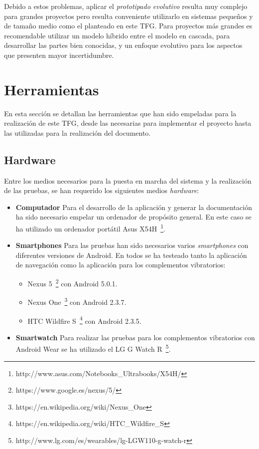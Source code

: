 Debido a estos problemas, aplicar el \emph{prototipado evolutivo} resulta muy complejo para grandes
proyectos pero resulta conveniente utilizarlo en sistemas pequeños y de tamaño medio como el
planteado en este \acs{TFG}. Para proyectos más grandes es recomendable utilizar un modelo híbrido
entre el modelo en cascada, para desarrollar las partes bien conocidas, y un enfoque evolutivo para
los aspectos que presenten mayor incertidumbre.

\section{Herramientas}

En esta sección se detallan las herramientas que han sido empeladas para la realización de este
\acs{TFG}, desde las necesarias para implementar el proyecto hasta las utilizadas para la
realización del documento.

\subsection{Hardware}
\label{sec:herramientasHardware}

Entre los medios necesarios para la puesta en marcha del sistema y la realización de las pruebas, se
han requerido los siguientes medios \emph{hardware}:

\begin{itemize}
  \item \textbf{Computador} Para el desarrollo de la aplicación y generar la documentación ha sido
    necesario empelar un ordenador de propósito general. En este caso se ha utilizado un ordenador
    portátil Asus X54H~\footnote{http://www.asus.com/Notebooks\_Ultrabooks/X54H/}.

  \item \textbf{Smartphones} Para las pruebas han sido necesarios varios \emph{smartphones} con
    diferentes versiones de Android. En todos se ha testeado tanto la aplicación de navegación como
    la aplicación para los complementos vibratorios:
    \begin{itemize}
      \item Nexus 5~\footnote{https://www.google.es/nexus/5/} con Android 5.0.1.
      \item Nexus One~\footnote{https://en.wikipedia.org/wiki/Nexus\_One} con Android 2.3.7.
      \item HTC Wildfire S~\footnote{https://en.wikipedia.org/wiki/HTC\_Wildfire\_S} con Android
        2.3.5.
    \end{itemize}

  \item \textbf{Smartwatch} Para realizar las pruebas para los complementos vibratorios con Android
    Wear se ha utilizado el LG G Watch
    R~\footnote{http://www.lg.com/es/wearables/lg-LGW110-g-watch-r}.

\end{itemize}

